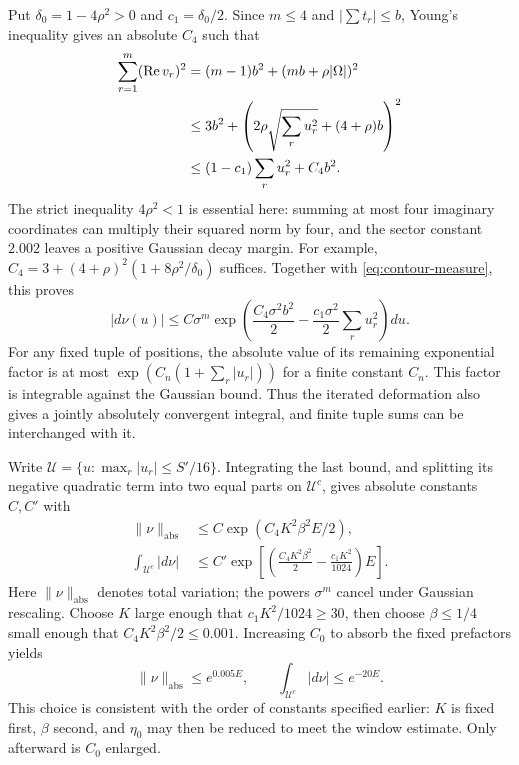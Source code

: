Put $\delta_0=1-4\rho^2>0$ and $c_1=\delta_0/2$. Since $m\le4$ and
$|\sum t_r|\le b$, Young's inequality gives an absolute $C_4$ such that
\begin{align}
 \sum_{r=1}^m(\operatorname{Re} v_r)^2
 &=(m-1)b^2+(mb+\rho|\Omega|)^2 \notag\\
 &\le 3b^2+
       \left(2\rho\sqrt{\sum_r u_r^2}+(4+\rho)b\right)^2 \notag\\
 &\le (1-c_1)\sum_r u_r^2+C_4b^2.
 \label{eq:contour-quadratic}
\end{align}
The strict inequality $4\rho^2<1$ is essential here: summing at most
four imaginary coordinates can multiply their squared norm by four,
and the sector constant $2.002$ leaves a positive Gaussian decay margin.
For example,
$C_4=3+(4+\rho)^2(1+8\rho^2/\delta_0)$ suffices.
Together with \eqref{eq:contour-measure}, this proves
\[
 |d\nu(u)|\le C\sigma^m
 \exp\left(\frac{C_4\sigma^2b^2}{2}
           -\frac{c_1\sigma^2}{2}\sum_r u_r^2\right)du.
\]
For any fixed tuple of positions, the absolute value of its remaining
exponential factor is at most $\exp(C_n(1+\sum_r|u_r|))$ for a finite
constant $C_n$. This factor is integrable against the Gaussian bound.
Thus the iterated deformation also gives a jointly absolutely
convergent integral, and finite tuple sums can be interchanged with it.

Write $\mathcal U=\{u:\max_r|u_r|\le S'/16\}$. Integrating the last
bound, and splitting its negative quadratic term into two equal parts
on $\mathcal U^c$, gives absolute constants $C,C'$ with
\begin{align*}
 \|\nu\|_{\mathrm{abs}}
   &\le C\exp(C_4K^2\beta^2E/2),\\
 \int_{\mathcal U^c}|d\nu|
   &\le C'\exp\left[
      \left(\frac{C_4K^2\beta^2}{2}
                 -\frac{c_1K^2}{1024}\right)E\right].
\end{align*}
Here $\|\nu\|_{\mathrm{abs}}$ denotes total variation; the powers
$\sigma^m$ cancel under Gaussian rescaling. Choose $K$ large enough that
$c_1K^2/1024\ge30$, then choose $\beta\le1/4$ small enough that
$C_4K^2\beta^2/2\le0.001$. Increasing $C_0$ to absorb the fixed
prefactors yields
\begin{equation}
 \|\nu\|_{\mathrm{abs}}\le e^{0.005E},\qquad
 \int_{\mathcal U^c}|d\nu|\le e^{-20E}.
 \label{eq:contour-mass}
\end{equation}
This choice is consistent with the order of constants specified earlier:
$K$ is fixed first, $\beta$ second, and $\eta_0$ may then be reduced to
meet the window estimate. Only afterward is $C_0$ enlarged.

